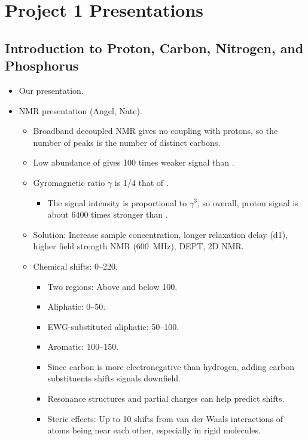 \documentclass[../notes.tex]{subfiles}
\begin{document}
\chapter{Project 1 Presentations}
\section{Introduction to Proton, Carbon, Nitrogen, and Phosphorus}
\begin{itemize}
    \item {}Our presentation.
    \item {} NMR presentation (Angel, Nate).
    \begin{itemize}
        \item Broadband decoupled  NMR gives no coupling with protons, so the number of peaks is the number of distinct carbons.
        \item Low abundance of  gives 100 times weaker signal than .
        \item Gyromagnetic ratio $\gamma$ is 1/4 that of .
        \begin{itemize}
            \item The signal intensity is proportional to $\gamma^3$, so overall, proton signal is about 6400 times stronger than .
        \end{itemize}
        \item Solution: Increase sample concentration, longer relaxation delay (d1), higher field strength NMR (\SI{600}{\mega\hertz}), DEPT, 2D NMR.
        \item Chemical shifts: \SIrange{0}{220}{\partspermillion}.
        \begin{itemize}
            \item Two regions: Above and below \SI{100}{\partspermillion}.
            \item Aliphatic: \SIrange{0}{50}{\partspermillion}.
            \item EWG-substituted aliphatic: \SIrange{50}{100}{\partspermillion}.
            \item Aromatic: \SIrange{100}{150}{\partspermillion}.
            \item Since carbon is more electronegative than hydrogen, adding carbon substituents shifts signals downfield.
            \item Resonance structures and partial charges can help predict shifts.
            \item Steric effects: Up to \SI{10}{\partspermillion} shifts from van der Waals interactions of atoms being near each other, especially in rigid molecules.

\end{itemize}
\end{itemize}
\end{itemize}
\end{document}
